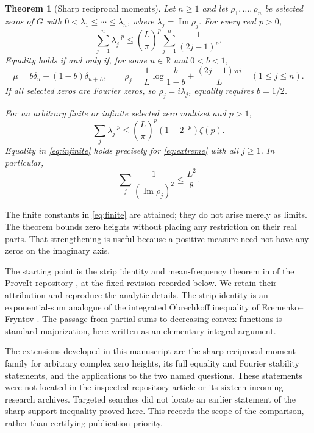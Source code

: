 \documentclass[11pt]{article}
\newtheorem{theorem}{Theorem}[section]
\theoremstyle{remark}\newtheorem{remark}[theorem]{Remark}
\newcommand{\R}{\mathbb R}
\newcommand{\Impart}{\operatorname{Im}}
\begin{document}
\begin{theorem}[Sharp reciprocal moments]\label{thm:main}
Let $n\ge1$ and let $\rho_1,\ldots,\rho_n$ be selected zeros of $G$ with
$0<\lambda_1\le\cdots\le\lambda_n$, where $\lambda_j=\Impart\rho_j$.
For every real $p>0$,
\begin{equation}\label{eq:finite}
 \sum_{j=1}^n\lambda_j^{-p}
 \le \left(\frac L\pi\right)^p
       \sum_{j=1}^n\frac1{(2j-1)^p}.
\end{equation}
Equality holds if and only if, for some $u\in\R$ and $0<b<1$,
\begin{equation}\label{eq:extreme}
 \mu=b\delta_u+(1-b)\delta_{u+L},\qquad
 \rho_j=\frac1L\log\frac b{1-b}+\frac{(2j-1)\pi i}{L}
 \quad(1\le j\le n).
\end{equation}
If all selected zeros are Fourier zeros, so $\rho_j=i\lambda_j$, equality requires
$b=1/2$.

For an arbitrary finite or infinite selected zero multiset and $p>1$,
\begin{equation}\label{eq:infinite}
 \sum_j\lambda_j^{-p}
 \le\left(\frac L\pi\right)^p(1-2^{-p})\zeta(p).
\end{equation}
Equality in \eqref{eq:infinite} holds precisely for \eqref{eq:extreme} with all
$j\ge1$. In particular,
\begin{equation}\label{eq:square}
 \boxed{\displaystyle\sum_j\frac1{(\Impart\rho_j)^2}\le\frac{L^2}{8}.}
\end{equation}
\end{theorem}

The finite constants in \eqref{eq:finite} are attained; they do not arise merely
as limits. The theorem bounds zero heights without placing any restriction on
their real parts. That strengthening is useful because a positive measure need
not have any zeros on the imaginary axis.

The starting point is the strip identity and mean-frequency theorem in
 of the ProveIt repository \cite{ProveIt}, at the
fixed revision recorded below. We retain their attribution and reproduce the
analytic details. The strip identity is an exponential-sum analogue of the
integrated Obrechkoff inequality of Eremenko--Fryntov \cite{EF}. The passage from
partial sums to decreasing convex functions is standard majorization, here
written as an elementary integral argument.

The extensions developed in this manuscript are the sharp reciprocal-moment
family for arbitrary complex zero heights, its full equality and Fourier
stability statements, and the applications to the two named questions. These
statements were not located in the inspected repository article or its sixteen
incoming research archives. Targeted searches did not locate an earlier statement
of the sharp support inequality proved here. This records the scope of the
comparison, rather than certifying publication priority.
\end{document}
